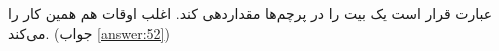 \section{}
\paragraph{}\label{hint:143}
عبارت  قرار است یک بیت را در پرچم‌ها مقداردهی کند. اغلب اوقات هم همین کار را می‌کند. (جواب \ref{answer:52})